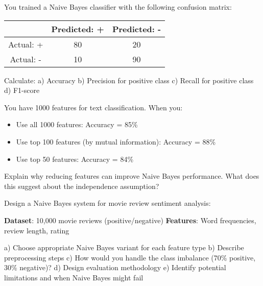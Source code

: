 \documentclass{article}
\newcounter{exercise}
\begin{document}
\begin{tcolorbox}[colback=gray!5!white,colframe=gray!75!black,title=Problem \stepcounter{exercise}: Model Evaluation]

You trained a Naive Bayes classifier with the following confusion matrix:

\begin{center}
\begin{tabular}{c|cc}
 & Predicted: + & Predicted: - \\
\hline
Actual: + & 80 & 20 \\
Actual: - & 10 & 90 \\
\end{tabular}
\end{center}

Calculate:
a) Accuracy
b) Precision for positive class
c) Recall for positive class
d) F1-score
\end{tcolorbox}

\begin{tcolorbox}[colback=gray!5!white,colframe=gray!75!black,title=Problem \stepcounter{exercise}: Feature Selection Impact]

You have 1000 features for text classification. When you:
\begin{itemize}
    \item Use all 1000 features: Accuracy = 85\%
    \item Use top 100 features (by mutual information): Accuracy = 88\%
    \item Use top 50 features: Accuracy = 84\%
\end{itemize}

Explain why reducing features can improve Naive Bayes performance. What does this suggest about the independence assumption?
\end{tcolorbox}

\begin{tcolorbox}[colback=gray!5!white,colframe=gray!75!black,title=Problem \stepcounter{exercise}: Real-world Application Design]

Design a Naive Bayes system for movie review sentiment analysis:

\textbf{Dataset}: 10,000 movie reviews (positive/negative)
\textbf{Features}: Word frequencies, review length, rating

a) Choose appropriate Naive Bayes variant for each feature type
b) Describe preprocessing steps
c) How would you handle the class imbalance (70\% positive, 30\% negative)?
d) Design evaluation methodology
e) Identify potential limitations and when Naive Bayes might fail
\end{tcolorbox}
\end{document}
